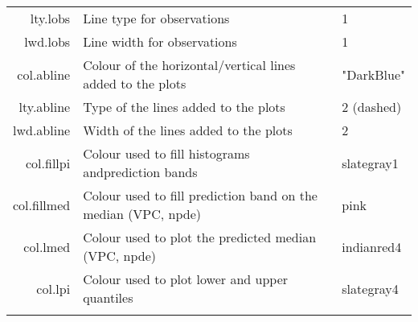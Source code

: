 \begin{center}
\begin{tabular}{r p{10cm} p{3cm}}
{\sf lty.lobs} & Line type for observations & 1 \\
{\sf lwd.lobs} & Line width for observations & 1 \\
{\sf col.abline} & Colour of the horizontal/vertical lines added to the plots & "DarkBlue" \\
{\sf lty.abline} & Type of the lines added to the plots & 2 (dashed) \\
{\sf lwd.abline} & Width of the lines added to the plots & 2 \\
{\sf col.fillpi} & Colour used to fill histograms andprediction bands & slategray1 \\
{\sf col.fillmed} & Colour used to fill prediction band on the median (VPC, npde) & pink \\
{\sf col.lmed} & Colour used to plot the predicted median (VPC, npde) & indianred4 \\
{\sf col.lpi} & Colour used to plot lower and upper quantiles & slategray4 \\
& & \\
\hline
\end{tabular} 
\par \kern -1cm
\end{center}

